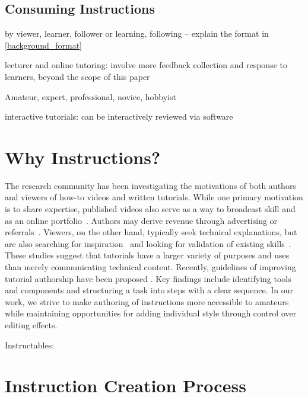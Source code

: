 \subsection{Consuming Instructions}
by viewer, learner, follower
or learning, following -- explain the format in \ref{background_format}

lecturer and online tutoring: involve more feedback collection and response to learners, beyond the scope of this paper

Amateur, expert, professional, novice, hobbyist

interactive tutorials: can be interactively reviewed via software


\section{Why Instructions?}
\label{background_why}

The research community has been investigating the motivations of both authors and viewers of how-to videos and written tutorials. While one primary motivation is to share expertise, published videos also serve as a way to broadcast skill and as an online portfolio~\cite{Torrey:2007he,Kuznetsov:2010:REA:1868914.1868950}. Authors may derive revenue through advertising or referrals~\cite{Lafreniere:2012tl}. Viewers, on the other hand, typically seek technical explanations, but are also searching for inspiration~\cite{Torrey:2009fc} and looking for validation of existing skills~\cite{Lafreniere:2012tl}.
%
These studies suggest that tutorials have a larger variety of purposes and uses than merely communicating technical content. Recently, guidelines of improving tutorial authorship have been proposed \cite{Wakkary:2015:TAH:2702123.2702550}. Key findings include identifying tools and components and structuring a task into steps with a clear sequence. In our work, we strive to make authoring of instructions more accessible to amateurs while maintaining opportunities for adding individual style through control over editing effects.

Instructables: \cite{Tseng:2014:PVP:2598510.2598540}



\section{Instruction Creation Process}
\label{background_creation}


